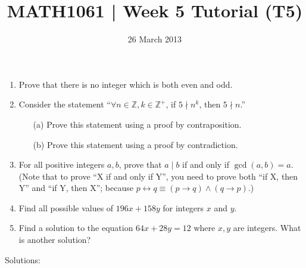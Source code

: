 \documentclass[a4paper,12pt]{article}
\begin{document}
\pagestyle{myheadings}

\title{MATH1061 | Week 5 Tutorial (T5)}
\date{26 March 2013}
\maketitle

\begin{enumerate}
\item Prove that there is no integer which is both even and odd.
\item Consider the statement ``$\forall n \in \mathbb{Z}, k \in \mathbb{Z}^+$,
      if $5 \nmid n^k$, then $5 \nmid n$.''
\begin{itemize}
    \item[(a)] Prove this statement using a proof by contraposition.
    \item[(b)] Prove this statement using a proof by contradiction.
\end{itemize}
\item For all positive integers $a, b$, prove that $a \mid b$ if and only if
$\gcd(a, b) = a$. (Note that to prove ``X if and only if Y'', you need to prove
both ``if X, then Y'' and ``if Y, then X'';
because $p \leftrightarrow q \equiv (p \to q) \land (q \to p)$.)
\item Find all possible values of $196x + 158y$ for integers $x$ and $y$.
\item Find a solution to the equation $64x + 28y = 12$ where $x, y$ are
integers. What is another solution?
\end{enumerate}

\newpage

Solutions:
\end{document}
